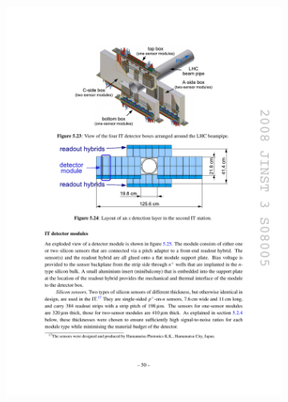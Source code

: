\begin{figure}[!h]
    \centering
    \begin{subfigure}[m]{0.49\textwidth}
        \centering
        \includegraphics[width=1.0\textwidth]{figs/Detector/it_layout.pdf}
    \end{subfigure}
    \begin{subfigure}[m]{0.49\textwidth}
        \centering

\end{subfigure}
\end{figure}
